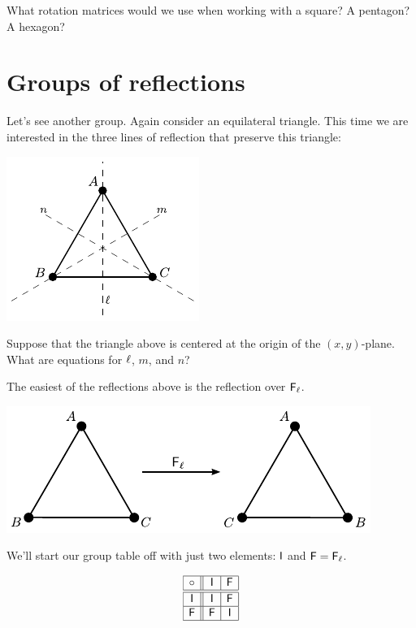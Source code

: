 \documentclass{ximera}
\begin{document}
\begin{question} 
What rotation matrices would we use when working with a square?  A
pentagon?  A hexagon?
\end{question}



\section{Groups of reflections}

Let's see another group. Again consider an equilateral triangle.  This
time we are interested in the three lines of reflection that preserve
this triangle:
\begin{image}
\includegraphics{symTriRef.pdf}
\end{image}

\begin{question}
Suppose that the triangle above is centered at the origin of the
$(x,y)$-plane. What are equations for $\ell$, $m$,
and $n$?
\end{question}


The easiest of the reflections above is the reflection over
$\mathsf{F}_{\ell}$.
\begin{image}
\includegraphics{symTriRef1.pdf}
\end{image}
We'll start our group table off with just two elements: $\mathsf{I}$ and
$\mathsf{F}=\mathsf{F}_{\ell}$.

\[
\begin{array}{| c || c | c |}\hline
\circ & \mathsf{I} & \mathsf{F} \\ \hline\hline
\mathsf{I} & \mathsf{I} & \mathsf{F} \\\hline
\mathsf{F} & \mathsf{F} & \mathsf{I} \\ \hline
\end{array}
\]
\end{document}
